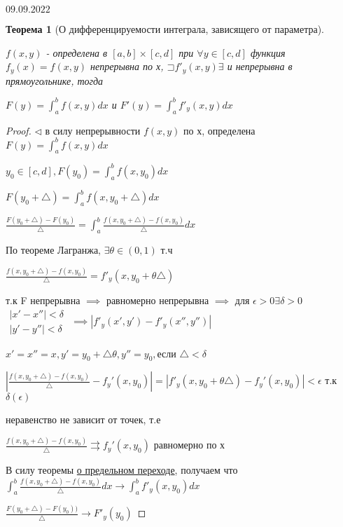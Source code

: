 \documentclass[a4paper, 12pt]{article}
\newcommand\letsymbol{\mathord{\sqsupset}}
\newtheorem{theorem}{Теорема}[section]
\theoremstyle{definition}
\theoremstyle{remark}
\begin{document}
     $09.09.2022$

     \begin{theorem}[О дифференцируемости интеграла, зависящего от параметра]\hypertarget{theorem4}{}
          $f(x,y)$ - определена в $[a, b]\times[c, d]$ при $\forall y \in [c, d]$
          функция $f_y(x) = f(x, y)$ непрерывна по х, $\letsymbol{} f'_y(x,y)\exists$
          и непрерывна в прямоугольнике, тогда

          $F(y) = \int_{a}^{b}f(x,y)dx$ и $F'(y) = \int_{a}^{b}f'_y(x,y)dx$
     \end{theorem}
\begin{proof}
     $\triangleleft$ в силу непрерывности $f(x,y)$ по х, определена $F(y) = \int_{a}^{b}f(x,y)dx$

     $y_0 \in [c,d], F(y_0) = \int_{a}^{b}f(x,y_0)dx$

     $F(y_0+\triangle) = \int_{a}^{b}f(x,y_0 + \triangle)dx$

     $\frac{F(y_0+\triangle) - F(y_0)}{\triangle} = \int_{a}^{b}\frac{f(x,y_0+\triangle) - f(x,y_0)}{\triangle}dx$

     По теореме Лагранжа, $\exists \theta \in (0, 1)$ т.ч 

     $\frac{f(x,y_0+\triangle) - f(x, y_0)}{\triangle} = f'_y(x, y_0+\theta\triangle)$

     т.к F непрерывна $\implies$ равномерно непрерывна  $\implies$
для $\epsilon>0 \exists \delta>0$
$\begin{array}{l}
     |x' - x''|< \delta\\
     |y' - y''|<\delta
\end{array}
$
$\implies |f'_y(x', y') - f'_y(x'', y'')|$
   

$x' = x'' = x, y' = y_0 + \triangle\theta, y'' = y_0,$если $\triangle<\delta$

$|\frac{f(x,y_0+\triangle) - f(x, y_0)}{\triangle} - f_y'(x,y_0)| = |f'_y(x, y_0+\theta\triangle) - f_y'(x,y_0)|<\epsilon$ т.к $\delta(\epsilon)$

неравенство не зависит от точек, т.е

$\frac{f(x,y_0+\triangle) - f(x, y_0)}{\triangle}\rightrightarrows f_y'(x,y_0)$ равномерно по х

В силу теоремы \hyperlink{p2}{о предельном переходе}, получаем что $\int_a^b \frac{f(x,y_0+\triangle) - f(x, y_0)}{\triangle}dx \rightarrow \int_a^b f'_y(x, y_0)dx$

$\frac{F(y_0+\triangle) - F(y_0))}{\triangle} \rightarrow F'_y(y_0)$
\end{proof}
\end{document}

